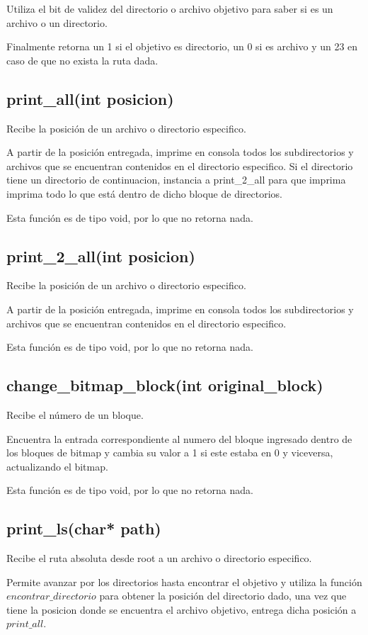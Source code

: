 \documentclass[12pt]{article}
\begin{document}
Utiliza el bit de validez del directorio o archivo objetivo para saber si es un archivo o un directorio.

Finalmente retorna un 1 si el objetivo es directorio, un 0 si es archivo y un 23 en caso de que no exista la ruta dada.

\subsection{print\_all(int posicion)}
Recibe la posición de un archivo o directorio especifico.

A partir de la posición entregada, imprime en consola todos los subdirectorios y archivos que se encuentran contenidos en el directorio especifico. Si el directorio tiene un directorio de continuacion, instancia a print\_2\_all para que imprima imprima todo lo que está dentro de dicho bloque de directorios.

Esta función es de tipo void, por lo que no retorna nada.

\subsection{print\_2\_all(int posicion)}
Recibe la posición de un archivo o directorio especifico.

A partir de la posición entregada, imprime en consola todos los subdirectorios y archivos que se encuentran contenidos en el directorio especifico.

Esta función es de tipo void, por lo que no retorna nada.

\subsection{change\_bitmap\_block(int original\_block)}
Recibe el número de un bloque.

Encuentra la entrada correspondiente al numero del bloque ingresado dentro de los bloques de bitmap y cambia su valor a 1 si este estaba en 0 y viceversa, actualizando el bitmap.

Esta función es de tipo void, por lo que no retorna nada.

\subsection{print\_ls(char* path)}
Recibe el ruta absoluta desde root a un archivo o directorio especifico.

Permite avanzar por los directorios hasta encontrar el objetivo y utiliza la función $encontrar\_directorio$ para obtener la posición del directorio dado, una vez que tiene la posicion donde se encuentra el archivo objetivo, entrega dicha posición a $print\_all$.
\end{document}
